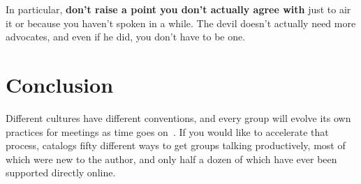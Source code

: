 \documentclass[10pt,letterpaper]{article}
\begin{document}
In particular, \textbf{don't raise a point you don't actually agree with} just
to air it or because you haven't spoken in a while.  The devil doesn't actually
need more advocates, and even if he did, you don't have to be one.

\section*{Conclusion}

Different cultures have different conventions, and every group will evolve its
own practices for meetings as time goes on~\cite{Bollier2014}. If you would like
to accelerate that process, \cite{Brookfield2016} catalogs fifty different ways
to get groups talking productively, most of which were new to the author, and
only half a dozen of which have ever been supported directly online.


\end{document}
